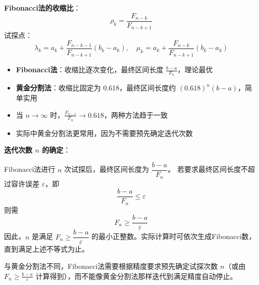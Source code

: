 \textbf{Fibonacci法的收缩比}：
\[
\rho_k = \frac{F_{n-k}}{F_{n-k+1}}
\]
试探点：
\[
\lambda_k = a_k + \frac{F_{n-k-1}}{F_{n-k+1}}(b_k - a_k),\quad
\mu_k = a_k + \frac{F_{n-k}}{F_{n-k+1}}(b_k - a_k)
\]

\begin{notebox}
\begin{itemize}[itemsep=0.3em]
    \item \textbf{Fibonacci法}：收缩比逐次变化，最终区间长度 $\frac{b-a}{F_n}$，理论最优
    \item \textbf{黄金分割法}：收缩比固定为 0.618，最终区间长度约 $(0.618)^n(b-a)$，简单实用
    \item 当 $n \to \infty$ 时，$\frac{F_{n-1}}{F_n} \to 0.618$，两种方法趋于一致
    \item 实际中黄金分割法更常用，因为不需要预先确定迭代次数
\end{itemize}
\end{notebox}

\textbf{迭代次数 $n$ 的确定}：

Fibonacci法进行 $n$ 次试探后，最终区间长度为 $\dfrac{b-a}{F_n}$。
若要求最终区间长度不超过容许误差 $\varepsilon$，即
\[
\frac{b-a}{F_n} \leq \varepsilon
\]
则需
\[
F_n \geq \frac{b-a}{\varepsilon}
\]
因此，$n$ 是满足 $F_n \geq \dfrac{b-a}{\varepsilon}$ 的最小正整数。实际计算时可依次生成Fibonacci数，直到满足上述不等式为止。

\begin{notebox}[Fibonacci法的特点]
与黄金分割法不同，Fibonacci法需要根据精度要求预先确定试探次数 $n$（或由 $F_n \geq \frac{b-a}{\varepsilon}$ 计算得到），而不能像黄金分割法那样迭代到满足精度自动停止。
\end{notebox}

